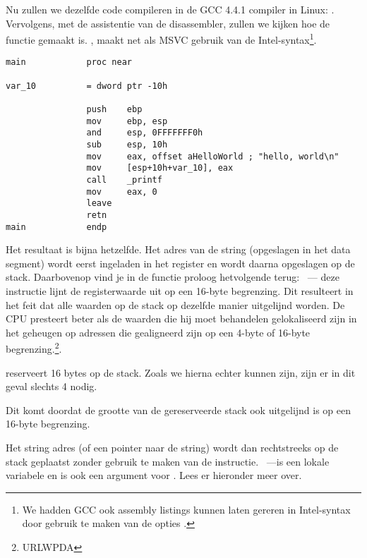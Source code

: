 
Nu zullen we dezelfde \CCpp code compileren in de GCC 4.4.1 compiler in Linux: .
Vervolgens, met de assistentie van de \IDA disassembler, zullen we kijken hoe de \main functie gemaakt is.
\IDA, maakt net als MSVC gebruik van de Intel-syntax\footnote{We hadden GCC ook assembly listings kunnen laten gereren in Intel-syntax door gebruik te maken van de opties .}.

\begin{lstlisting}[caption=code in \IDA]
main            proc near

var_10          = dword ptr -10h

                push    ebp
                mov     ebp, esp
                and     esp, 0FFFFFFF0h
                sub     esp, 10h
                mov     eax, offset aHelloWorld ; "hello, world\n"
                mov     [esp+10h+var_10], eax
                call    _printf
                mov     eax, 0
                leave
                retn
main            endp
\end{lstlisting}

Het resultaat is bijna hetzelfde.
Het adres van de  string (opgeslagen in het data segment) wordt eerst ingeladen in het \EAX register en wordt daarna opgeslagen op de stack.
Daarbovenop vind je in de functie proloog hetvolgende terug: ~---
deze instructie lijnt de \ESP registerwaarde uit op een 16-byte begrenzing.
Dit resulteert in het feit dat alle waarden op de stack op dezelfde manier uitgelijnd worden.
De CPU presteert beter als de waarden die hij moet behandelen gelokaliseerd zijn in het geheugen op adressen die gealigneerd zijn op een 4-byte of 16-byte begrenzing.\footnote{URLWPDA}.

 reserveert 16 bytes op de stack. Zoals we hierna echter kunnen zijn, zijn er in dit geval slechts 4 nodig.

Dit komt doordat de grootte van de gereserveerde stack ook uitgelijnd is op een 16-byte begrenzing.

Het string adres (of een pointer naar de string) wordt dan rechtstreeks op de stack geplaatst zonder gebruik te maken van de \PUSH instructie.
~---is een lokale variabele en is ook een argument voor \printf{}.
Lees er hieronder meer over.

